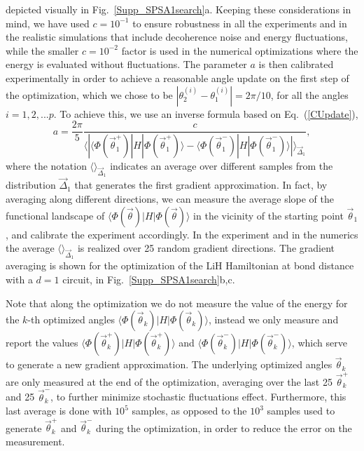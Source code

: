 \documentclass[twocolumn]{revtex4-1}
\newcommand{\1}{\mathbbm{1}}
\begin{document}
depicted visually in Fig.~\ref{Supp_SPSA1search}a. Keeping these considerations in mind, we have used $c=10^{-1}$ to ensure robustness in all the experiments and in the realistic simulations that include decoherence noise and energy fluctuations, while the smaller $c=10^{-2}$ factor is used in the numerical optimizations where the energy is evaluated without fluctuations. 
The parameter $a$ is then calibrated experimentally in order to achieve a reasonable angle update on the first step of the optimization, which we chose to be $|\theta^{(i)}_{2}-\theta^{(i)}_{1}|=2\pi/10$, for all the angles $i=1,2,...p$. To achieve this, we use an inverse formula based on Eq.~(\ref{CUpdate}),
\begin{equation}
\label{avggrad}
a= \frac{2\pi }{5}\frac{c}{\Big\langle|\langle\Phi({\vec \theta^+_1})|H|\Phi({\vec \theta^+_1})\rangle-\langle\Phi({\vec \theta^-_1})|H|\Phi({\vec \theta^-_1})\rangle|\Big\rangle_{\vec\Delta_1}},
\end{equation}
where the notation $\Big\langle\Big\rangle_{\vec\Delta_1}$ indicates an average over different samples from the distribution $\vec\Delta_1$ that generates the first gradient approximation. In fact, by averaging along different directions, we can measure the average slope of the functional landscape of $\langle\Phi(\vec\theta)|H|\Phi(\vec\theta)\rangle$ in the vicinity of the starting point $\vec\theta_1$, and calibrate the experiment accordingly. In the experiment and in the numerics the average $\Big\langle\Big\rangle_{\vec\Delta_1}$ is realized over 25 random gradient directions. The gradient averaging is shown for the optimization of the LiH Hamiltonian at bond distance with a $d=1$ circuit, in Fig.~\ref{Supp_SPSA1search}b,c.

Note that along the optimization we do not measure the value of the energy for the $k$-th optimized angles $\langle\Phi(\vec\theta_k)|H|\Phi(\vec\theta_k)\rangle$, instead we only measure and report the values $\langle\Phi(\vec\theta^+_k)|H|\Phi(\vec\theta^+_k)\rangle$ and $\langle\Phi(\vec\theta^-_k)|H|\Phi(\vec\theta^-_k)\rangle$, which serve to generate a new gradient approximation. The underlying optimized angles $\vec\theta_k$ are only measured at the end of the optimization, averaging over the last 25 $\vec\theta^+_k$ and 25 $\vec\theta_k^-$, to further minimize stochastic fluctuations effect. Furthermore, this last average is done with $10^5$ samples, as opposed to the $10^3$ samples used to generate $\vec\theta_k^+$ and $\vec\theta_k^-$ during the optimization, in order to reduce the error on the measurement.
\end{document}

